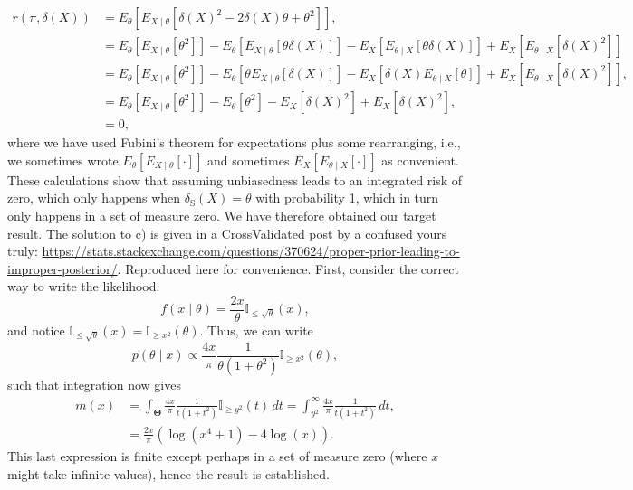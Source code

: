 \documentclass[a4paper,10pt, notitlepage]{report}
\begin{document}
{\begin{align}
\label{eq:q2_b_line1}
 r(\pi, \delta(X)) &=   E_\theta \left[E_{X \mid \theta} \left[ \delta(X)^2 - 2\delta(X) \theta + \theta^2\right]\right],\\
 \label{eq:q2_b_line2}
 & = E_\theta \left[ E_{X \mid \theta}\left[\theta^2 \right]\right] -E_\theta \left[ E_{X \mid \theta}\left[\theta\delta(X) \right]\right] -E_X \left[E_{\theta \mid X}\left[\theta \delta(X)\right]\right] + E_X \left[E_{\theta \mid X} \left[\delta(X)^2\right]\right]\\
 \label{eq:q2_b_line3} 
  &=  E_\theta \left[ E_{X \mid \theta}\left[\theta^2 \right]\right] -E_\theta \left[\theta E_{X \mid \theta}\left[\delta(X) \right]\right] -E_X \left[\delta(X)E_{\theta \mid X}\left[\theta \right]\right] + E_X \left[E_{\theta \mid X} \left[\delta(X)^2\right]\right],\\
    &=  E_\theta \left[ E_{X \mid \theta}\left[\theta^2 \right]\right] - E_\theta \left[\theta^2 \right] -E_X \left[\delta(X)^2\right] + E_X \left[\delta(X)^2\right],\\
\nonumber
 & = 0,
\end{align}
 where we have used Fubini's theorem for expectations plus some rearranging, i.e., we sometimes wrote $E_\theta [E_{X \mid \theta}[\cdot]]$ and sometimes $E_X[E_{\theta \mid X}[\cdot]]$ as convenient.
 These calculations show that assuming unbiasedness leads to an integrated risk of zero, which only happens when $\delta_{\text{S}}(X) = \theta$ with probability 1, which in turn only happens in a set of measure zero.
 We have therefore obtained our target result.
The solution to c) is given in a CrossValidated post by a confused yours truly: \url{https://stats.stackexchange.com/questions/370624/proper-prior-leading-to-improper-posterior/}.
Reproduced here for convenience.
First, consider the correct way to write the likelihood:
\begin{equation*}
 f(x \mid \theta) = \frac{2x}{\theta}\mathbb{I}_{\leq \sqrt{\theta}}(x),
\end{equation*}
and notice $\mathbb{I}_{\leq \sqrt{\theta}}(x) = \mathbb{I}_{\geq x^2}(\theta)$.
Thus, we can write
\begin{equation*}
p(\theta \mid x) \propto \frac{4x}{\pi}\frac{1}{\theta(1 +\theta^2)}\mathbb{I}_{\geq x^2}(\theta),
\end{equation*}
such that integration now gives
\begin{align*}
 m(x) &= \int_{\boldsymbol{\Theta}} \frac{4x}{\pi}\frac{1}{t(1 +t^2)}\mathbb{I}_{\geq y^2}(t)\,dt = \int_{y^2}^\infty \frac{4x}{\pi}\frac{1}{t(1 +t^2)}\,dt,\\
 &= \frac{2x}{\pi}\left(\log(x^4 + 1) - 4\log(x)\right).
\end{align*}
This last expression is finite except perhaps in a set of measure zero (where $x$ might take infinite values), hence the result is established.
}
\end{document}
